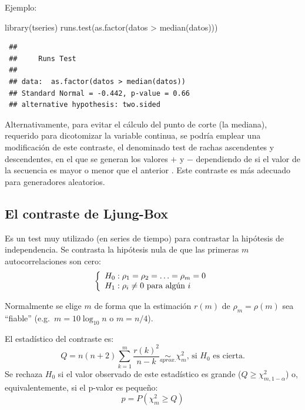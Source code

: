 \documentclass[
  10pt,
]{book}
\newenvironment{Shaded}{\begin{snugshade}}{\end{snugshade}}
\newcommand{\FunctionTok}[1]{\textcolor[rgb]{0.00,0.00,0.00}{#1}}
\newcommand{\NormalTok}[1]{#1}
\newcommand{\SpecialCharTok}[1]{\textcolor[rgb]{0.00,0.00,0.00}{#1}}
\theoremstyle{break}
\theoremstyle{nonumberplain}
\begin{document}
Ejemplo:

\begin{Shaded}
\begin{Highlighting}[]
\FunctionTok{library}\NormalTok{(tseries)}
\FunctionTok{runs.test}\NormalTok{(}\FunctionTok{as.factor}\NormalTok{(datos }\SpecialCharTok{\textgreater{}} \FunctionTok{median}\NormalTok{(datos)))}
\end{Highlighting}
\end{Shaded}

\begin{verbatim}
 ## 
 ##     Runs Test
 ## 
 ## data:  as.factor(datos > median(datos))
 ## Standard Normal = -0.442, p-value = 0.66
 ## alternative hypothesis: two.sided
\end{verbatim}

Alternativamente, para evitar el cálculo del punto de corte (la mediana), requerido para dicotomizar la variable continua, se podría emplear una modificación de este contraste, el denominado test de rachas ascendentes y descendentes, en el que se generan los valores \(+\) y \(-\) dependiendo de si el valor de la secuencia es mayor o menor que el anterior \citep[ver e.g.][]{downham1970}.
Este contraste es más adecuado para generadores aleatorios.

\hypertarget{ljungbox}{%
\subsection{El contraste de Ljung-Box}\label{ljungbox}}

Es un test muy utilizado (en series de tiempo) para contrastar la hipótesis de independencia.
Se contrasta la hipótesis nula de que las primeras \(m\) autocorrelaciones son cero:
\[\left\{\begin{array}[c]{l}
    H_0:\rho_{1}=\rho_{2}=\ldots=\rho_{m}=0\\
    H_1:\rho_{i}\neq0\text{ para algún } i
\end{array}\right.\]

Normalmente se elige \(m\) de forma que la estimación \(r(m)\) de \(\rho_{m}=\rho(m)\) sea ``fiable'' (e.g.~\(m = 10\log_{10}n\) o \(m = n/4\)).

El estadístico del contraste es:
\[Q=n(n+2)\sum_{k=1}^{m}\frac{r(k)^{2}}{n-k}\underset{aprox.}{\sim}\chi
_{m}^{2}\text{, si }H_0\text{ es cierta.}\]
Se rechaza \(H_0\) si el valor observado de este estadístico es grande (\(Q\geq \chi_{m,1-\alpha}^{2}\)) o, equivalentemente, si el p-valor es pequeño:
\[p=P\left( {\chi_{m}^{2}}\geq Q\right)\]
\end{document}
